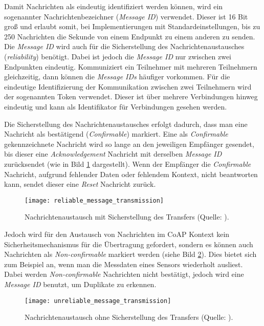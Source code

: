 Damit Nachrichten als eindeutig identifiziert werden können, wird ein sogenannter Nachrichtenbezeichner (\textit{Message ID}) verwendet. Dieser ist 16 Bit groß und erlaubt somit, bei Implementierungen mit Standardeinstellungen, bis zu 250 Nachrichten die Sekunde von einem Endpunkt zu einem anderen zu senden. Die \textit{Message ID} wird auch für die Sicherstellung des Nachrichtenaustausches (\textit{reliability}) benötigt. Dabei ist jedoch die \textit{Message ID} nur zwischen zwei Endpunkten eindeutig. Kommuniziert ein Teilnehmer mit mehreren Teilnehmern gleichzeitig, dann können die \textit{Message IDs} häufiger vorkommen. Für die eindeutige Identifizierung der Kommunikation zwischen zwei Teilnehmern wird der sogenannten Token verwendet. Dieser ist über mehrere Verbindungen hinweg eindeutig und kann als Identifikator für Verbindungen gesehen werden.

Die Sicherstellung des Nachrichtenaustausches erfolgt dadurch, dass man eine Nachricht als bestätigend (\textit{Confirmable}) markiert. Eine als \textit{Confirmable} gekennzeichnete Nachricht wird so lange an den jeweiligen Empfänger gesendet, bis dieser eine \textit{Acknowledgement} Nachricht mit derselben \textit{Message ID} zurücksendet (wie in Bild \ref{fig:nachrichtenaustausch-mit-sicherstellung-des-transfers} dargestellt). Wenn der Empfänger die \textit{Confirmable} Nachricht, aufgrund fehlender Daten oder fehlendem Kontext, nicht beantworten kann, sendet dieser eine \textit{Reset} Nachricht zurück.

\begin{figure}[h]
    \centering
    \texttt{[image: reliable\_message\_transmission]}
    \caption{Nachrichtenaustausch mit Sicherstellung des Transfers (Quelle: \autocite{RFC7252}).}
    \label{fig:nachrichtenaustausch-mit-sicherstellung-des-transfers}
\end{figure}

Jedoch wird für den Austausch von Nachrichten im CoAP Kontext kein Sicherheitsmechanismus für die Übertragung gefordert, sondern es können auch Nachrichten als \textit{Non-confirmable} markiert werden (siehe Bild \ref{fig:nachrichtenaustausch-ohne-sicherstellung-des-transfers}). Dies bietet sich zum Beispiel an, wenn man die Messdaten eines Sensors wiederholt ausliest. Dabei werden \textit{Non-confirmable} Nachrichten nicht bestätigt, jedoch wird eine \textit{Message ID} benutzt, um Duplikate zu erkennen.

\begin{figure}[h]
    \centering
    \texttt{[image: unreliable\_message\_transmission]}
    \caption{Nachrichtenaustausch ohne Sicherstellung des Transfers (Quelle: \autocite{RFC7252}).}
    \label{fig:nachrichtenaustausch-ohne-sicherstellung-des-transfers}
\end{figure}

